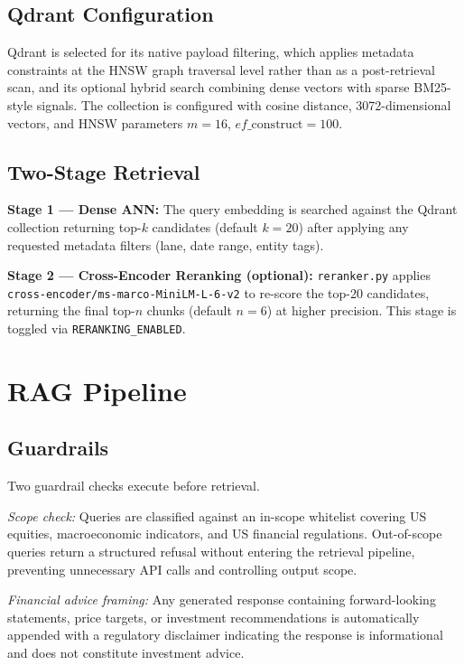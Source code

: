 \documentclass[10pt,a4paper,twocolumn]{article}
\begin{document}
\subsection{Qdrant Configuration}

Qdrant is selected for its native payload filtering, which applies metadata constraints at
the HNSW graph traversal level rather than as a post-retrieval scan, and its optional hybrid
search combining dense vectors with sparse BM25-style signals. The collection is configured
with cosine distance, 3072-dimensional vectors, and HNSW parameters $m = 16$,
$ef\_\mathrm{construct} = 100$.

\subsection{Two-Stage Retrieval}

\textbf{Stage 1 --- Dense ANN:} The query embedding is searched against the Qdrant
collection returning top-$k$ candidates (default $k = 20$) after applying any requested
metadata filters (lane, date range, entity tags).

\textbf{Stage 2 --- Cross-Encoder Reranking (optional):} \texttt{reranker.py} applies
\texttt{cross-encoder/ms-marco-MiniLM-L-6-v2} to re-score the top-20 candidates, returning
the final top-$n$ chunks (default $n = 6$) at higher precision. This stage is toggled via
\texttt{RERANKING\_ENABLED}.

\section{RAG Pipeline}

\subsection{Guardrails}

Two guardrail checks execute before retrieval.

\textit{Scope check:} Queries are classified against an in-scope whitelist covering US
equities, macroeconomic indicators, and US financial regulations. Out-of-scope queries
return a structured refusal without entering the retrieval pipeline, preventing unnecessary
API calls and controlling output scope.

\textit{Financial advice framing:} Any generated response containing forward-looking
statements, price targets, or investment recommendations is automatically appended with a
regulatory disclaimer indicating the response is informational and does not constitute
investment advice.
\end{document}
